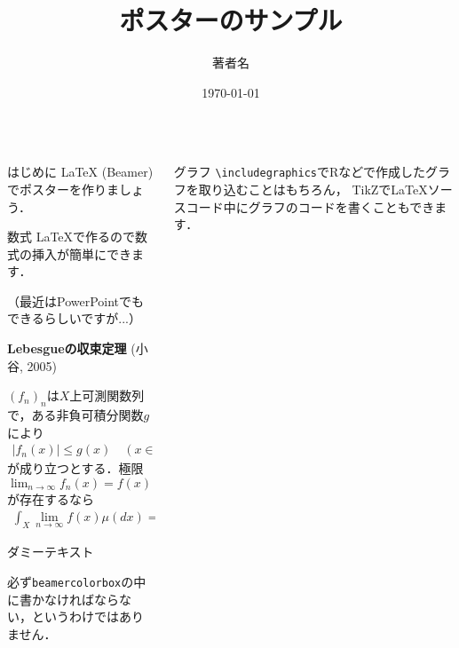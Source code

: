 \documentclass[unicode,colorlinks]{beamer}
\title{ポスターのサンプル}
\author{著者名}
\institute{所属機関名}
\date{\today}
\newcommand{\absolute}[1]{\left|#1\right|}
\begin{document}
\begin{frame}[fragile]
\begin{columns}[t]
    \begin{column}{.32\linewidth}
        \begin{block}{はじめに}
            \LaTeX{} (Beamer)でポスターを作りましょう．
        \end{block}
        \begin{block}{数式}
            \LaTeX{}で作るので数式の挿入が簡単にできます．

            （最近はPowerPointでもできるらしいですが...）

            \bigskip
            \bigskip

            \textbf{Lebesgueの収束定理} (小谷, 2005)

            $(f_n)_n$は$X$上可測関数列で，ある非負可積分関数$g$により
            \begin{align*}
                \absolute{f_n(x)} \leq g(x) \quad (x \in X)
            \end{align*}
            が成り立つとする．極限 $\lim_{n \to \infty}f_n(x) = f(x)$ が存在するなら
            \begin{align*}
                \int_X \lim_{n \to \infty}f(x) \mu(dx)
                = \lim_{n \to \infty}\int_X f_n (x) \mu(dx)
            \end{align*}
        \end{block}
        \begin{block}{ダミーテキスト}
            \lipsum[1]
        \end{block}
        必ず\texttt{beamercolorbox}の中に書かなければならない，というわけではありません．
    \end{column}
    \begin{column}{.32\linewidth}
        \begin{block}{グラフ}
            \verb+\includegraphics+でRなどで作成したグラフを取り込むことはもちろん，
            TikZでLaTeXソースコード中にグラフのコードを書くこともできます．

            \bigskip


\end{block}
\end{column}
\end{columns}
\end{frame}
\end{document}
